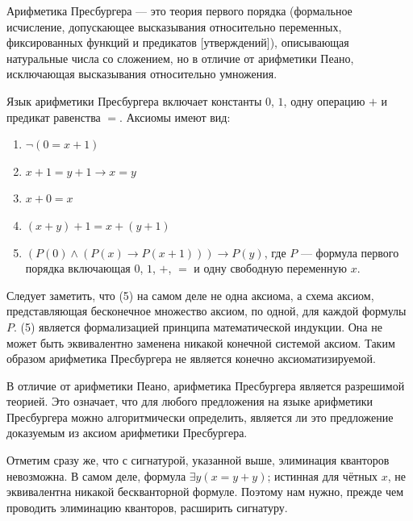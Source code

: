 
    
    \begin{Def}
        Арифметика Пресбургера — это теория первого порядка (формальное исчисление, допускающее высказывания относительно переменных, фиксированных функций и предикатов [утверждений]), описывающая натуральные числа со сложением, но в отличие от арифметики Пеано, исключающая высказывания относительно умножения.
    \end{Def}
    \begin{Def}
        Язык арифметики Пресбургера включает константы $0$, $1$, одну операцию $+$ и предикат равенства $=$. Аксиомы имеют вид:
        \begin{enumerate}
            \item $\neg (0 = x + 1)$
            \item $x + 1 = y + 1 \rightarrow x = y$
            \item $x + 0 = x$
            \item $(x + y) + 1 = x + (y + 1)$
            \item$ (P(0) \wedge (P(x) \rightarrow P(x + 1))) \rightarrow P(y)$, где $P$ ---  формула первого порядка включающая $0$, $1$, $+$, $=$ и одну свободную переменную $x$.
        \end{enumerate}
        Следует заметить, что (5) на самом деле не одна аксиома, а схема аксиом, представляющая бесконечное множество аксиом, по одной, для каждой формулы $P$. (5) является формализацией принципа математической индукции. Она не может быть эквивалентно заменена никакой конечной системой аксиом. Таким образом арифметика Пресбургера не является конечно аксиоматизируемой.
    \end{Def}
    \begin{Rem}
        В отличие от арифметики Пеано, арифметика Пресбургера является разрешимой теорией. Это означает, что для любого предложения на языке арифметики Пресбургера можно алгоритмически определить, является ли это предложение доказуемым из аксиом арифметики Пресбургера.
    \end{Rem}
    
    
    \begin{Rem}
        Отметим сразу же, что с сигнатурой, указанной выше, элиминация кванторов невозможна. В самом деле, формула $\exists y (x = y + y)$; истинная для чётных $x$, не эквивалентна никакой бескванторной формуле. Поэтому нам нужно, прежде чем проводить элиминацию кванторов, расширить сигнатуру.
    \end{Rem}
    
